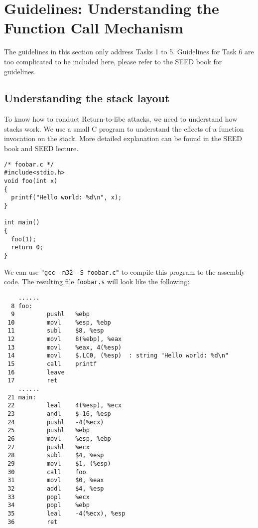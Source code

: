 \section{Guidelines: Understanding the Function Call Mechanism}

The guidelines in this section only address Tasks 1 to 5. 
Guidelines for Task 6 are too complicated to be included here, 
please refer to the SEED book for guidelines. 


\subsection{Understanding the stack layout}

To know how to conduct Return-to-libc attacks, we need to 
understand how stacks work.  We use a small C program to understand 
the effects of a function invocation on the stack. More detailed 
explanation can be found in the SEED book and SEED lecture. 


\begin{lstlisting}
/* foobar.c */
#include<stdio.h>
void foo(int x)
{
  printf("Hello world: %d\n", x);
}

int main()
{
  foo(1);
  return 0;
}
\end{lstlisting}

We can use {\tt "gcc -m32 -S foobar.c"} to
compile this program to the assembly code.
The resulting file {\tt foobar.s} will look like the following:


\begin{lstlisting}
    ......
  8 foo:
  9         pushl   %ebp
 10         movl    %esp, %ebp
 11         subl    $8, %esp
 12         movl    8(%ebp), %eax   
 13         movl    %eax, 4(%esp)
 14         movl    $.LC0, (%esp)  : string "Hello world: %d\n"
 15         call    printf
 16         leave
 17         ret
    ......
 21 main:
 22         leal    4(%esp), %ecx
 23         andl    $-16, %esp
 24         pushl   -4(%ecx)
 25         pushl   %ebp
 26         movl    %esp, %ebp
 27         pushl   %ecx
 28         subl    $4, %esp
 29         movl    $1, (%esp)
 30         call    foo
 31         movl    $0, %eax
 32         addl    $4, %esp
 33         popl    %ecx
 34         popl    %ebp
 35         leal    -4(%ecx), %esp
 36         ret
\end{lstlisting}
 


